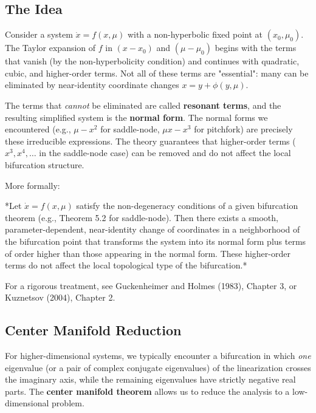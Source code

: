 \subsection{The Idea}\label{sec:5.3.1}

Consider a system $\dot{x} = f(x, \mu)$ with a non-hyperbolic fixed point at $(x_0, \mu_0)$. The Taylor expansion of $f$ in $(x - x_0)$ and $(\mu - \mu_0)$ begins with the terms that vanish (by the non-hyperbolicity condition) and continues with quadratic, cubic, and higher-order terms. Not all of these terms are "essential": many can be eliminated by near-identity coordinate changes $x = y + \phi(y, \mu)$.

The terms that \textit{cannot} be eliminated are called \textbf{resonant terms}, and the resulting simplified system is the \textbf{normal form}. The normal forms we encountered (e.g., $\mu - x^2$ for saddle-node, $\mu x - x^3$ for pitchfork) are precisely these irreducible expressions. The theory guarantees that higher-order terms ($x^3, x^4, \ldots$ in the saddle-node case) can be removed and do not affect the local bifurcation structure.

More formally:

\begin{theorem}\label{thm:5.4}
*Let $\dot{x} = f(x, \mu)$ satisfy the non-degeneracy conditions of a given bifurcation theorem (e.g., Theorem 5.2 for saddle-node). Then there exists a smooth, parameter-dependent, near-identity change of coordinates in a neighborhood of the bifurcation point that transforms the system into its normal form plus terms of order higher than those appearing in the normal form. These higher-order terms do not affect the local topological type of the bifurcation.*

For a rigorous treatment, see Guckenheimer and Holmes (1983), Chapter 3, or Kuznetsov (2004), Chapter 2.
\end{theorem}


\subsection{Center Manifold Reduction}\label{sec:5.3.2}

For higher-dimensional systems, we typically encounter a bifurcation in which \textit{one} eigenvalue (or a pair of complex conjugate eigenvalues) of the linearization crosses the imaginary axis, while the remaining eigenvalues have strictly negative real parts. The \textbf{center manifold theorem} allows us to reduce the analysis to a low-dimensional problem.


